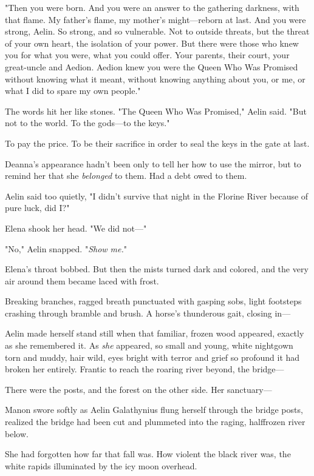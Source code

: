"Then you were born. And you were an answer to the gathering darkness, with that flame. My father's flame, my mother's might---reborn at last. And you were strong, Aelin. So strong, and so vulnerable. Not to outside threats, but the threat of your own heart, the isolation of your power. But there were those who knew you for what you were, what you could offer. Your parents, their court, your great-uncle  and Aedion. Aedion knew you were the Queen Who Was Promised without knowing what it meant, without knowing anything about you, or me, or what I did to spare my own people."

The words hit her like stones. "The Queen Who Was Promised," Aelin said. "But not to the world. To the gods---to the keys."

To pay the price. To be their sacrifice in order to seal the keys in the gate at last.

Deanna's appearance hadn't been only to tell her how to use the mirror, but to remind her that she \emph{belonged} to them. Had a debt owed to them.

Aelin said too quietly, "I didn't survive that night in the Florine River because of pure luck, did I?"

Elena shook her head. "We did not---"

"No," Aelin snapped. "\emph{Show me.}"

Elena's throat bobbed. But then the mists turned dark and colored, and the very air around them became laced with frost.

Breaking branches, ragged breath punctuated with gasping sobs, light footsteps crashing through bramble and brush. A horse's thunderous gait, closing in---

Aelin made herself stand still when that familiar, frozen wood appeared, exactly as she remembered it. As \emph{she} appeared, so small and young, white nightgown torn and muddy, hair wild, eyes bright with terror and grief so profound it had broken her entirely. Frantic to reach the roaring river beyond, the bridge---

There were the posts, and the forest on the other side. Her sanctuary---

Manon swore softly as Aelin Galathynius flung herself through the bridge posts, realized the bridge had been cut  and plummeted into the raging, halffrozen river below.

She had forgotten how far that fall was. How violent the black river was, the white rapids illuminated by the icy moon overhead.

